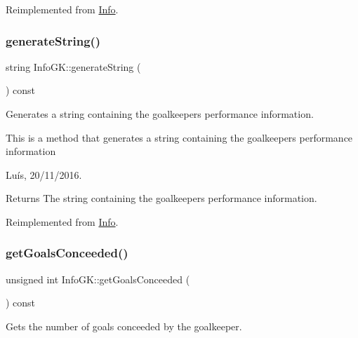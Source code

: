 Reimplemented from \hyperlink{class_info_a7e66fc93d6ab97827bbf50fa61c71186}{Info}.

\hypertarget{class_info_g_k_a7bdc5a14f105385b4d856c8df7a4c7d0}{}\label{class_info_g_k_a7bdc5a14f105385b4d856c8df7a4c7d0} 
\subsubsection{\texorpdfstring{generate\+String()}{generateString()}}
{\footnotesize\ttfamily string Info\+G\+K\+::generate\+String (\begin{DoxyParamCaption}{ }\end{DoxyParamCaption}) const\hspace{0.3cm}{\ttfamily [virtual]}}



Generates a string containing the goalkeeper\textquotesingle{}s performance information. 

This is a method that generates a string containing the goalkeeper\textquotesingle{}s performance information

Luís, 20/11/2016. 

\begin{DoxyReturn}{Returns}
The string containing the goalkeeper\textquotesingle{}s performance information. 
\end{DoxyReturn}


Reimplemented from \hyperlink{class_info_a5e52b35a9c17b58222bb57af16c16ce3}{Info}.

\hypertarget{class_info_g_k_a069874de6c798b3237388f3dbdb14de1}{}\label{class_info_g_k_a069874de6c798b3237388f3dbdb14de1} 
\subsubsection{\texorpdfstring{get\+Goals\+Conceeded()}{getGoalsConceeded()}}
{\footnotesize\ttfamily unsigned int Info\+G\+K\+::get\+Goals\+Conceeded (\begin{DoxyParamCaption}{ }\end{DoxyParamCaption}) const\hspace{0.3cm}{\ttfamily [virtual]}}



Gets the number of goals conceeded by the goalkeeper. 

